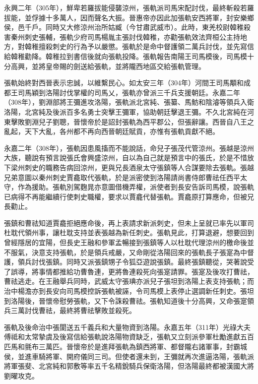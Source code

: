 永興二年（305年），鮮卑若羅拔能侵襲涼州，張軌派司馬宋配討伐，最終斬殺若羅拔能，並俘據十多萬人，因而聲名大振。晉惠帝亦因此加張軌安西將軍，封安樂鄉侯，邑千戶。同時又大修涼州治所姑臧（今甘肅武威市）。此時，東羌校尉韓稚殺害秦州刺史張輔，張軌少府司馬楊胤主張討伐韓稚，亦勸張軌效法齊桓公主持地方，對韓稚擅殺刺史的行為予以嚴懲。張軌於是命中督護領二萬兵討伐，並先寫信給韓稚勸降。韓稚拉到書信後就向張軌投降。張軌報告南陽王司馬模後，司馬模十分高興，並將皇帝賜的劍送給張軌，並將隴西地區交給張軌管理。

張軌始終對西晉表示忠誠，以維繫民心。如太安三年（304年）河間王司馬顒和成都王司馬穎到洛陽討伐掌權的司馬乂，張軌亦曾派三千兵支援朝廷。永嘉二年（308年），劉淵部將王彌進攻洛陽，張軌派北宮純、張纂、馬魴和陰濬等領兵入衛洛陽，北宮純及後派百多名勇士突擊王彌軍，協助朝廷擊退王彌。不久北宮純在河東擊敗劉淵兒子劉聰，晉懷帝於是詔封張軌為西平郡公，但張辭讓。西晉自八王之亂起，天下大亂，各州都不再向西晉朝廷賦貢，亦惟有張軌貢獻不絕。

永嘉二年（308年），張軌因患風搐而不能說話，命兒子張茂代管涼州。張越是涼州大族，聽說有預言說張氏會興盛涼州，自以為自己就是預言中的張氏，於是不惜放下梁州刺史的職務告病回涼州，更與兄長酒泉太守張鎮等人合謀要除去張軌。張越兄弟意圖以秦州刺史賈龕取代張軌，於是派密使到洛陽請尚書侍郎曹祛任西平太守，作為援助。張軌別駕麴晁亦意圖借機弄權，派使者到長安告訴司馬模，說張軌已病得不再能繼續行使刺史職權，要求以賈龕代替張軌。賈龕原打算應命，但被兄長勸止。

張鎮和曹祛知道賈龕拒絕應命後，再上表請求新派刺史，但未上呈就已率先以軍司杜耽代領州事，讓杜耽支持並表張越為新任刺史。張軌見此，打算退避，想要回到曾經隱居的宜陽，但長史王融和參軍孟暢接到張鎮等人以杜耽代理涼州的檄命後並不服氣，決意支持張軌，於是領兵戒嚴，又命剛從洛陽回來的張軌長子張寔為中督護，領兵討伐張鎮。同時又派張鎮甥子令狐亞遊說張鎮。最終張鎮聽從，哭著說受了誤導，將事情都推給功曹魯連，更將魯連殺死向張寔請罪。張寔及後攻打曹祛，曹祛逃走。在王融舉兵同時，武威太守張琠亦派兒子張坦到洛陽上表支持張軌；而治中楊澹亦到長安向司馬模控訴張軌被誣，令司馬模上表停止選調新任刺史。張坦到洛陽後，晉懷帝慰勞張軌，又下令誅殺曹祛。張軌知道後十分高興，又命張寔領兵三萬討伐曹祛，最終將曹祛擊敗並殺死。

張軌及後命治中張閬送五千義兵和大量物資到洛陽。永嘉五年（311年）光祿大夫傅祗和太常摯虞及後寫信給張軌說洛陽物資缺乏，張軌又立刻派參軍杜勵進獻五百匹馬和氈布三萬匹。晉懷帝於是進拜張軌為鎮西將軍、都督隴右諸軍事，封霸城侯，並進車騎將軍、開府儀同三司。但使者還未到，王彌就再次進逼洛陽，張軌派將軍張斐、北宮純和郭敷等率五千名精銳騎兵保衛洛陽，但洛陽最終都被漢國大將劉曜攻克。

